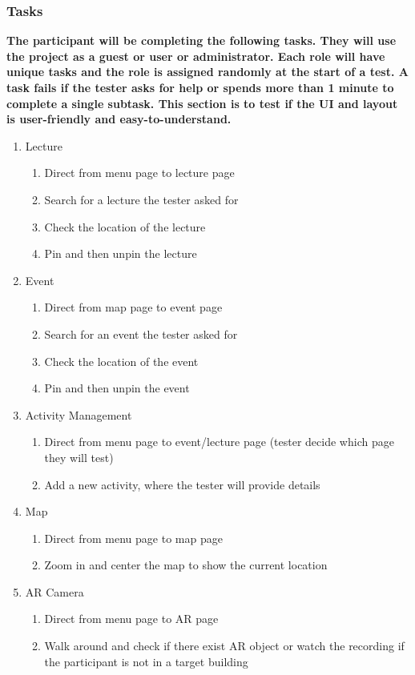 \documentclass[12pt, titlepage]{article}
\begin{document}
\subsubsection{Tasks}
\textbf{The participant will be completing the following tasks. They will use the project as a guest or user or administrator. Each role will have unique tasks and the role is assigned randomly at the start of a test. A task fails if the tester asks for help or spends more than 1 minute to complete a single subtask. This section is to test if the UI and layout is user-friendly and easy-to-understand.}
\begin{enumerate}
\item Lecture
\begin{enumerate}
\item Direct from menu page to lecture page
\item Search for a lecture the tester asked for
\item Check the location of the lecture
\item Pin and then unpin the lecture
\end{enumerate}
\item Event
\begin{enumerate}
\item Direct from map page to event page
\item Search for an event the tester asked for
\item Check the location of the event
\item Pin and then unpin the event
\end{enumerate}
\item Activity Management
\begin{enumerate}
\item Direct from menu page to event/lecture page (tester decide which page they will test)
\item Add a new activity, where the tester will provide details
\end{enumerate}
\item Map
\begin{enumerate}
\item Direct from menu page to map page
\item Zoom in and center the map to show the current location
\end{enumerate}
\item AR Camera
\begin{enumerate}
\item Direct from menu page to AR page
\item Walk around and check if there exist AR object or watch the recording if the participant is not in a target building

\end{enumerate}
\end{enumerate}
\end{document}
